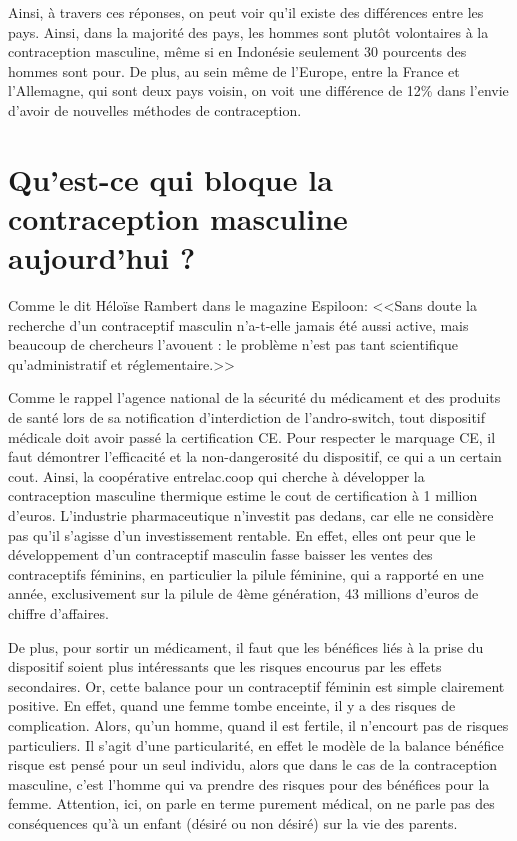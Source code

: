 \documentclass[12pt,a4paper]{report}
\begin{document}
Ainsi, à travers ces réponses, on peut voir qu'il existe des différences entre les pays. Ainsi, dans la majorité des pays, les hommes sont plutôt volontaires à la contraception masculine, même si en Indonésie seulement 30 pourcents des hommes sont pour. De plus, au sein même de l'Europe, entre la France et l'Allemagne, qui sont deux pays voisin, on voit une différence de 12\% dans l'envie d'avoir de nouvelles méthodes de contraception. \cite{heinemannAttitudesMaleFertility2005}





\chapter{Qu'est-ce qui bloque la contraception masculine aujourd'hui ?}

Comme le dit Héloïse Rambert dans le magazine Espiloon: <<Sans doute la recherche d'un contraceptif masculin n'a-t-elle jamais été aussi active, mais beaucoup de chercheurs l'avouent : le problème n'est pas tant scientifique qu'administratif et réglementaire.>> \cite{heloiserambertPourquoiPiluleMasculine2023}

Comme le rappel l'agence national de la sécurité du médicament et des produits de santé lors de sa notification d'interdiction de l'andro-switch, tout dispositif médicale doit avoir passé la certification CE. \cite{ActualiteAnneauContraceptif}
Pour respecter le marquage CE, il faut démontrer l'efficacité et la non-dangerosité du dispositif, ce qui a un certain cout. Ainsi, la coopérative entrelac.coop qui cherche à développer la contraception masculine thermique estime le cout de certification à 1 million d'euros. \cite{AccueilEntrelacCoop}
L'industrie pharmaceutique n'investit pas dedans, car elle ne considère pas qu'il s'agisse d'un investissement rentable. En effet, elles ont peur que le développement d'un contraceptif masculin fasse baisser les ventes des contraceptifs féminins, \cite{heloiserambertPourquoiPiluleMasculine2023}\cite{ENQUETEPourquoiDeveloppement2023} en particulier la pilule féminine, qui a rapporté en une année, exclusivement sur la pilule de 4ème génération, 43 millions d'euros de chiffre d'affaires. \cite{PilulesContraceptivesMarche2013}

De plus, pour sortir un médicament, il faut que les bénéfices liés à la prise du dispositif soient plus intéressants que les risques encourus par les effets secondaires. Or, cette balance pour un contraceptif féminin est simple clairement positive. En effet, quand une femme tombe enceinte, il y a des risques de complication. Alors, qu'un homme, quand il est fertile, il n'encourt pas de risques particuliers. Il s'agit d'une particularité, en effet le modèle de la balance bénéfice risque est pensé pour un seul individu, alors que dans le cas de la contraception masculine, c'est l'homme qui va prendre des risques pour des bénéfices pour la femme. \cite{heloiserambertPourquoiPiluleMasculine2023} Attention, ici, on parle en terme purement médical, on ne parle pas des conséquences qu'à un enfant (désiré ou non désiré) sur la vie des parents.
\end{document}
